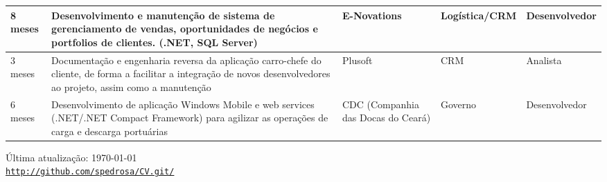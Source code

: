 \documentclass[letterpaper]{article}
\def\footerlink{http://github.com/spedrosa/CV.git/}
\begin{document}
\begin{tabular}{| l | p{7cm} | p{2cm} | p{2cm} | p{2cm} |}
  \hline
  8 meses & Desenvolvimento e manutenção de sistema de gerenciamento de vendas, oportunidades de negócios e portfolios de clientes. (.NET, SQL Server) & E-Novations & Logística/CRM & Desenvolvedor \\
  \hline
  3 meses & Documentação e engenharia reversa da aplicação carro-chefe do cliente, de forma a facilitar a integração de novos desenvolvedores ao projeto, assim como a manutenção & Plusoft & CRM & Analista \\
  \hline
  6 meses & Desenvolvimento de aplicação Windows Mobile e web services (.NET/.NET Compact Framework) para agilizar as operações de carga e descarga portuárias & CDC (Companhia das Docas do Ceará) & Governo & Desenvolvedor \\
  \hline
\end{tabular}

\bigskip

\begin{center}
  \begin{footnotesize}
    Última atualização: \today \\
    \href{\footerlink}{\texttt{\footerlink}}
  \end{footnotesize}
\end{center}
\end{document}
